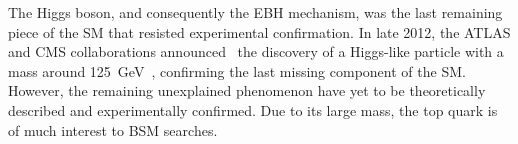 The Higgs boson, and consequently the EBH mechanism, was the last remaining piece of the SM that resisted experimental confirmation. In late 2012, the ATLAS and CMS collaborations announced~\cite{Theory:HiggsDiscoveryCMS,Theory:HiggsDiscoveryATLAS} the discovery of a Higgs-like particle with a mass around \SI{125}{\GeV}~\cite{Theory:HiggsMass}, confirming the last missing component of the SM. However, the remaining unexplained phenomenon have yet to be theoretically described and experimentally confirmed. Due to its large mass, the top quark is of much interest to BSM searches.
